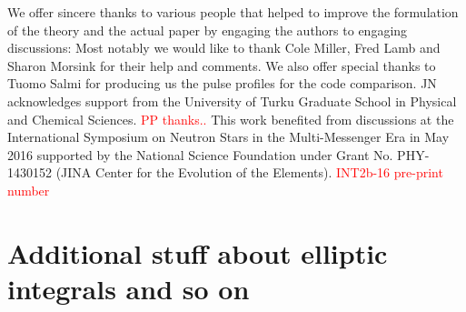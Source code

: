 \documentclass[iop, usenatbib]{emulateapj}
\newcommand{\red}[1]{\textcolor{red}{#1}}
\begin{document}
We offer sincere thanks to various people that helped to improve the formulation of the theory and the actual paper by engaging the authors to engaging discussions: Most notably we would like to thank Cole Miller, Fred Lamb and Sharon Morsink for their help and comments.
We also offer special thanks to Tuomo Salmi for producing us the pulse profiles for the code comparison.
JN acknowledges support from the University of Turku Graduate School in Physical and Chemical Sciences.
\red{PP thanks..}
This work benefited from discussions at the International Symposium on Neutron Stars in the Multi-Messenger Era in May 2016 supported by the National Science Foundation under Grant No. PHY-1430152 (JINA Center for the Evolution of the Elements).
\red{INT2b-16 pre-print number}



\clearpage






\clearpage
\appendix

\section{Additional stuff about elliptic integrals and so on}
\end{document}

